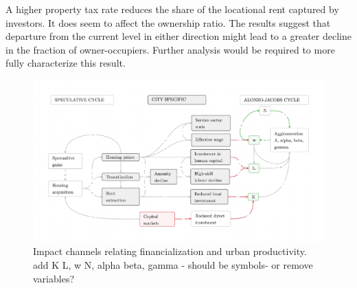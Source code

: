 A higher property tax rate reduces the share of the locational rent captured by investors. %
It does seem to affect the ownership ratio. The results suggest that departure from the current level in either direction might lead to a greater decline in the fraction of owner-occupiers. Further analysis would be required to more fully characterize this result.





\begin{figure}[h!tb]\label{fig-impact-channels2}
\begin{adjustwidth}{-0.24\textwidth}{-0.24\textwidth}
\centering
\includegraphics[scale=.15 ]{fig/impact-channels.png}%
\end{adjustwidth}
\caption[Impact channels relating financialization and urban productivity]{Impact channels relating financialization and urban productivity. {\color{red} add K L, w N, alpha beta, gamma - should be symbols- or remove variables?}}
\end{figure}


